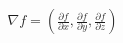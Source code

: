 \documentclass[preview]{standalone}
\begin{document}
\begin{align*}
\nabla f = \left( \frac{\partial f}{\partial x}, \frac{\partial f}{\partial y}, \frac{\partial f}{\partial z} \right)
\end{align*}
\end{document}
